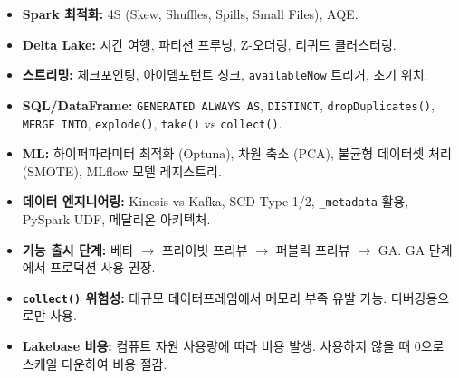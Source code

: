 \documentclass[11pt,a4paper]{article}
\theoremstyle{definition}
\begin{document}
\begin{tcolorbox}[title=\textbf{Databricks Lecture 14 핵심 요약}, colback=white, colframe=black!20!white, sharp corners, boxrule=0.5mm, breakable]
\begin{tcolorbox}[summary={퀴즈 2 & 과제 3 핵심 개념}]
\begin{itemize}
    \item \textbf{Spark 최적화:} 4S (Skew, Shuffles, Spills, Small Files), AQE.
    \item \textbf{Delta Lake:} 시간 여행, 파티션 프루닝, Z-오더링, 리퀴드 클러스터링.
    \item \textbf{스트리밍:} 체크포인팅, 아이뎀포턴트 싱크, \texttt{availableNow} 트리거, 초기 위치.
    \item \textbf{SQL/DataFrame:} \texttt{GENERATED ALWAYS AS}, \texttt{DISTINCT}, \texttt{dropDuplicates()}, \texttt{MERGE INTO}, \texttt{explode()}, \texttt{take()} vs \texttt{collect()}.
    \item \textbf{ML:} 하이퍼파라미터 최적화 (Optuna), 차원 축소 (PCA), 불균형 데이터셋 처리 (SMOTE), MLflow 모델 레지스트리.
    \item \textbf{데이터 엔지니어링:} Kinesis vs Kafka, SCD Type 1/2, \texttt{_metadata} 활용, PySpark UDF, 메달리온 아키텍처.
\end{itemize}
\end{tcolorbox}

\begin{tcolorbox}[caution={핵심 주의사항}]
\begin{itemize}
    \item \textbf{기능 출시 단계:} 베타 $\rightarrow$ 프라이빗 프리뷰 $\rightarrow$ 퍼블릭 프리뷰 $\rightarrow$ GA. GA 단계에서 프로덕션 사용 권장.
    \item \textbf{\texttt{collect()} 위험성:} 대규모 데이터프레임에서 메모리 부족 유발 가능. 디버깅용으로만 사용.
    \item \textbf{Lakebase 비용:} 컴퓨트 자원 사용량에 따라 비용 발생. 사용하지 않을 때 0으로 스케일 다운하여 비용 절감.
\end{itemize}
\end{tcolorbox}

\end{tcolorbox}
\end{document}
